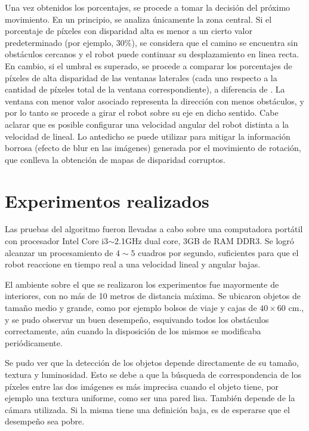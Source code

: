 \documentclass[journal]{IEEEtran}
\begin{document}
Una vez obtenidos los porcentajes, se procede a tomar la decisi\'on del pr\'oximo movimiento. En un principio, se analiza \'unicamente la zona central. Si el porcentaje de p\'ixeles con disparidad alta es menor a un cierto valor predeterminado (por ejemplo, $30\%$), se considera que el camino se encuentra sin obst\'aculos cercanos y el robot puede continuar su desplazamiento en linea recta. En cambio, si el umbral es superado, se procede a comparar los porcentajes de p\'ixeles de alta disparidad de las ventanas laterales (cada uno respecto a la cantidad de p\'ixeles total de la ventana correspondiente), a diferencia de \cite{KNG10}. La ventana con menor valor asociado representa la direcci\'on con menos obst\'aculos, y por lo tanto se procede a girar el robot sobre su eje en dicho sentido. Cabe aclarar que es posible configurar una velocidad angular del robot distinta a la velocidad de lineal. Lo antedicho se puede utilizar para mitigar la informaci\'on borrosa (efecto de blur en las im\'agenes) generada por el movimiento de rotaci\'on, que conlleva la obtenci\'on de mapas de disparidad corruptos.


\section{Experimentos realizados}

Las pruebas del algoritmo fueron llevadas a cabo sobre una computadora port\'atil con procesador Intel Core i3$ \sim $2.1GHz dual core, 3GB de RAM DDR3. Se logr\'o alcanzar un procesamiento de $4 \sim 5$ cuadros por segundo, suficientes para que el robot reaccione en tiempo real a una velocidad lineal y angular bajas.

El ambiente sobre el que se realizaron los experimentos fue mayormente de interiores, con no m\'as de 10 metros de distancia m\'axima. Se ubicaron objetos de tama\~no medio y grande, como por ejemplo bolsos de viaje y cajas de $40 \times 60$ cm., y se pudo observar un buen desempe\~no, esquivando todos los obst\'aculos correctamente, a\'un cuando la disposici\'on de los mismos se modificaba peri\'odicamente.

Se pudo ver que la detecci\'on de los objetos depende directamente de su tama\~no, textura y luminosidad. Esto se debe a que la b\'usqueda de correspondencia de los p\'ixeles entre las dos im\'agenes es m\'as imprecisa cuando el objeto tiene, por ejemplo una textura uniforme, como ser una pared lisa. Tambi\'en depende de la c\'amara utilizada. Si la misma tiene una definici\'on baja, es de esperarse que el desempe\~no sea pobre.
\end{document}
